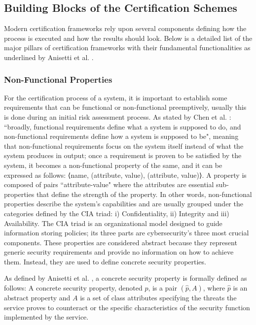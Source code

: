 

\subsection{Building Blocks of the Certification Schemes}
\label{bblocks}
Modern certification frameworks rely upon several components defining how the process is executed and how the results should look. Below is a detailed list of the major pillars of certification frameworks with their fundamental functionalities as underlined by Anisetti et al. \cite{anisetti2017semi}\cite{anisetti2022multi}.

\subsubsection{Non-Functional Properties}
For the certification process of a system, it is important to establish some requirements that can be functional or non-functional preemptively, usually this is done during an initial risk assessment process. As stated by Chen et al. \cite{chen2013verification}: ``broadly, functional requirements define what a system is supposed to do, and non-functional requirements define how a system is supposed to be", meaning that non-functional requirements focus on the system itself instead of what the system produces in output; once a requirement is proven to be satisfied by the system, it becomes a non-functional property of the same, and it can be expressed as follows: ⟨name, {(attribute, value), (attribute, value)}⟩. A property is composed of pairs ``attribute-value" where the attributes are essential sub-properties that define the strength of the property. In other words, non-functional properties describe the system's capabilities and are usually grouped under the categories defined by the CIA triad: i) Confidentiality, ii) Integrity and iii) Availability. The CIA triad is an organizational model designed to guide information storing policies; its three parts are cybersecurity's three most crucial components. These properties are considered abstract because they represent generic security requirements and provide no information on how to achieve them. Instead, they are used to define concrete security properties. 

As defined by Anisetti et al. \cite{anisetti2013test}, a concrete security property is formally defined as follows:
A concrete security property, denoted \(p\), is a pair \( ( \hat{p}, A) \), where \(\hat{p}\) is an abstract property and \(A\) is a set of class attributes specifying the threats the service proves to counteract or the specific characteristics of the security function implemented by the service. 

